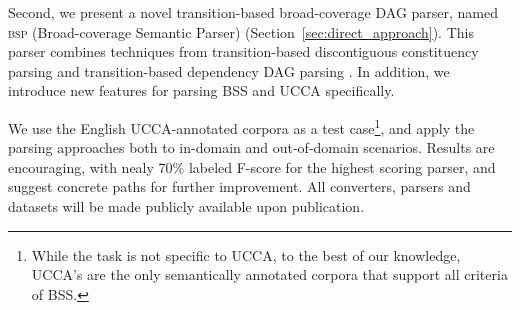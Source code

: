 \documentclass[11pt]{article}
\newcommand{\secref}[1]{Section~\ref{#1}}
\begin{document}
Second, we present a novel transition-based broad-coverage DAG parser, named
\textsc{bsp} (Broad-coverage Semantic Parser) (\secref{sec:direct_approach}).
This parser combines techniques from transition-based discontiguous constituency parsing \cite{maier2015discontinuous} and transition-based dependency DAG parsing \cite{tokgoz2015transition}. In addition, we introduce new features for parsing BSS and UCCA specifically.


We use the English UCCA-annotated corpora \cite{abend2013universal} as a test
case\footnote{While the task is not specific to UCCA,
  to the best of our knowledge, UCCA's are the only
  semantically annotated corpora that support all criteria of BSS.},
and apply the parsing approaches both to in-domain and out-of-domain scenarios.
Results are encouraging, with nealy 70\% labeled F-score for the highest
scoring parser, and suggest concrete paths for further improvement.
All converters, parsers and datasets will be made publicly available upon publication.

\end{document}
